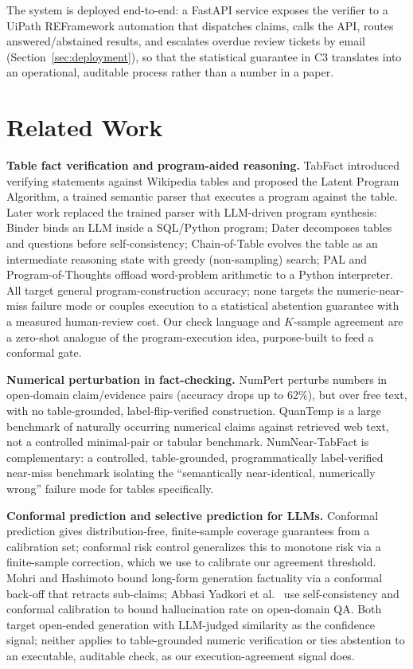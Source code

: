 \documentclass[journal]{IEEEtran}
\begin{document}
The system is deployed end-to-end: a FastAPI service exposes the verifier to
a UiPath REFramework automation that dispatches claims, calls the API,
routes answered/abstained results, and escalates overdue review tickets by
email (Section~\ref{sec:deployment}), so that the statistical guarantee in
C3 translates into an operational, auditable process rather than a number in
a paper.

\section{Related Work}
\label{sec:related}

\textbf{Table fact verification and program-aided reasoning.} TabFact
\cite{chen2020tabfact} introduced verifying statements against Wikipedia
tables and proposed the Latent Program Algorithm, a trained semantic parser
that executes a program against the table. Later work replaced the trained
parser with LLM-driven program synthesis: Binder \cite{cheng2023binder}
binds an LLM inside a SQL/Python program; Dater \cite{ye2023dater} decomposes
tables and questions before self-consistency; Chain-of-Table
\cite{wang2024chainoftable} evolves the table as an intermediate reasoning
state with greedy (non-sampling) search; PAL \cite{gao2023pal} and
Program-of-Thoughts \cite{chen2023pot} offload word-problem arithmetic to a
Python interpreter. All target general program-construction accuracy; none
targets the numeric-near-miss failure mode or couples execution to a
statistical abstention guarantee with a measured human-review cost. Our
check language and $K$-sample agreement are a zero-shot analogue of the
program-execution idea, purpose-built to feed a conformal gate.

\textbf{Numerical perturbation in fact-checking.} NumPert
\cite{aarnes2025numpert} perturbs numbers in open-domain claim/evidence
pairs (accuracy drops up to 62\%), but over free text, with no
table-grounded, label-flip-verified construction. QuanTemp
\cite{venktesh2024quantemp} is a large benchmark of naturally occurring
numerical claims against retrieved web text, not a controlled minimal-pair
or tabular benchmark. NumNear-TabFact is complementary: a controlled,
table-grounded, programmatically label-verified near-miss benchmark isolating
the ``semantically near-identical, numerically wrong'' failure mode for
tables specifically.

\textbf{Conformal prediction and selective prediction for LLMs.} Conformal
prediction \cite{angelopoulos2021gentle} gives distribution-free,
finite-sample coverage guarantees from a calibration set; conformal risk
control \cite{angelopoulos2024risk} generalizes this to monotone risk via a
finite-sample correction, which we use to calibrate our agreement threshold.
Mohri and Hashimoto \cite{mohri2024conformal} bound long-form generation
factuality via a conformal back-off that retracts sub-claims; Abbasi Yadkori
et al.\ \cite{abbasiyadkori2024conformal} use self-consistency and conformal
calibration to bound hallucination rate on open-domain QA. Both target
open-ended generation with LLM-judged similarity as the confidence signal;
neither applies to table-grounded numeric verification or ties abstention to
an executable, auditable check, as our execution-agreement signal does.
\end{document}
